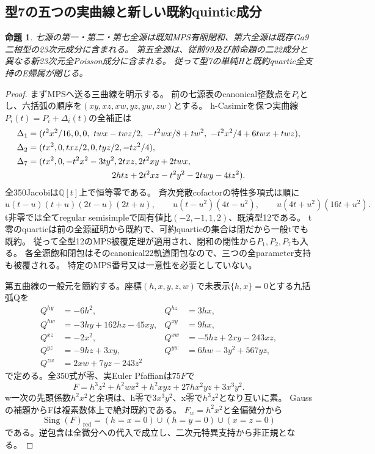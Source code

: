 \documentclass[a4paper,11pt]{ltjsarticle}
\newtheorem{proposition}{命題}[section]
\theoremstyle{definition}
\newcommand{\red}{\mathrm{red}}
\begin{document}
\subsection{型7の五つの実曲線と新しい既約quintic成分}
\begin{proposition}\label{prop:nil22-long-five-curves}
七源の第一・第二・第七全源は既知MPS有限閉和、第六全源は既存Ga9二根型の23次元成分に含まれる。
第五全源は、従前99及び前命題の二22成分と異なる新23次元全Poisson成分に含まれる。
従って型7の単純Hと既約quartic全支持のE帰属が閉じる。
\end{proposition}
\begin{proof}
まずMPSへ送る三曲線を明示する。
前の七源表のcanonical整数点を$P_i$とし、六括弧の順序を$(xy,xz,xw,yz,yw,zw)$とする。
h-Casimirを保つ実曲線$P_i(t)=P_i+\Delta_i(t)$の全補正は
\[
\begin{aligned}
 \Delta_1={}&(t^2x^2/16,0,0,\ twx-twz/2,\ -t^2wx/8+tw^2,\ -t^2x^2/4+6twx+twz),\\
 \Delta_2={}&(tx^2,0,txz/2,0,tyz/2,-tz^2/4),\\
 \Delta_7={}&(tx^2,0,-t^2x^2-3ty^2,2txz,2t^2xy+2twx,\\
 &\hspace{30mm}2htz+2t^2xz-t^2y^2-2twy-4tz^2).
\end{aligned}
\]
全350Jacobiは$\mathbb Q[t]$上で恒等零である。
斉次発散cofactorの特性多項式は順に
\[
 u(t-u)(t+u)(2t-u)(2t+u),\qquad u(t-u^2)(4t-u^2),\qquad u(4t+u^2)(16t+u^2).
\]
t非零では全てregular semisimpleで固有値比$(-2,-1,1,2)$、既済型12である。
t零のquarticは前の全源証明から既約で、可約quarticの集合は閉だから一般tでも既約。
従って全型12のMPS被覆定理が適用され、閉和の閉性から$P_1,P_2,P_7$も入る。
各全源飽和閉包はそのcanonical22軌道閉包なので、三つの全parameter支持も被覆される。
特定のMPS番号又は一意性を必要としていない。

第五曲線の一般元を簡約する。座標$(h,x,y,z,w)$で未表示$\{h,x\}=0$とする九括弧Qを
\[
\begin{aligned}
 Q^{hy}&=-6h^2,&Q^{hz}&=3hx,\\
 Q^{hw}&=-3hy+162hz-45xy,&Q^{xy}&=9hx,\\
 Q^{xz}&=-2x^2,&Q^{xw}&=-5hz+2xy-243xz,\\
 Q^{yz}&=-9hz+3xy,&Q^{yw}&=6hw-3y^2+567yz,\\
 Q^{zw}&=2xw+7yz-243z^2
\end{aligned}
\]
で定める。全350式が零、実Euler Pfaffianは$75F$で
\[
 F=h^3z^2+h^2wx^2+h^2xyz+27hx^2yz+3x^3y^2.
\]
w一次の先頭係数$h^2x^2$と余項は、h零で$3x^3y^2$、x零で$h^3z^2$となり互いに素。
Gaussの補題からFは複素数体上で絶対既約である。
$F_w=h^2x^2$と全偏微分から
\[
 \operatorname{Sing}(F)_{\red}=(h=x=0)\cup(h=y=0)\cup(x=z=0)
\]
である。逆包含は全微分への代入で成立し、二次元特異支持から非正規となる。


\end{proof}
\end{document}

